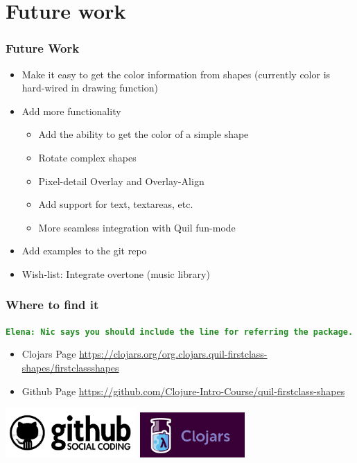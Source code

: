 \documentclass{beamer}
\newcommand{\comment}[1]{{\bf \tt  {#1}}}
\newcommand{\emcomment}[1]{\textcolor{ForestGreen}{\comment{Elena: {#1}}}}
\begin{document}
\section{Future work}

\begin{frame}
	\frametitle{Future Work}
	\begin{itemize}
		\item Make it easy to get the color information from shapes (currently color is hard-wired in drawing function) 
		\item Add more functionality
		\begin{itemize}
			\item Add the ability to get the color of a simple shape
			\item Rotate complex shapes
			\item Pixel-detail Overlay and Overlay-Align
			\item Add support for text, textareas, etc.  
			\item More seamless integration with Quil fun-mode
		\end{itemize}
		\item Add examples to the git repo 
		\item Wish-list: Integrate overtone (music library)
	\end{itemize}
\end{frame}

\begin{frame}
	\frametitle{Where to find it}
	\emcomment{Nic says you should include the line for referring the package.}
	\begin{itemize}
	\item Clojars Page
	\href{https://clojars.org/org.clojars.quil-firstclass-shapes/firstclassshapes}{https://clojars.org/org.clojars.quil-firstclass-shapes/firstclassshapes}
	\item Github Page
	\href{https://github.com/Clojure-Intro-Course/quil-firstclass-shapes}{https://github.com/Clojure-Intro-Course/quil-firstclass-shapes}
	\end{itemize}
	\includegraphics[width=5cm]{PresentationImages/github.png}
	\hspace{1cm}
	\includegraphics[width=4cm]{PresentationImages/clojars.png}
\end{frame}
\end{document}
